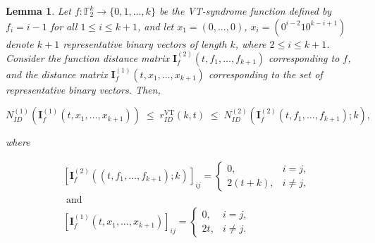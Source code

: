 \documentclass[11 pt]{article}
\numberwithin{equation}{section}
\newtheorem{lemma}[theorem]{Lemma}
\begin{document}
    \begin{lemma}\label{VT_red_bound}
        Let \( f: \mathbb{F}_2^k \rightarrow \{0, 1, \ldots,k\}\) be the VT-syndrome function defined by \( f_i = i - 1 \) for all \( 1 \leq i \leq k + 1 \), and let $x_1 = (0, \ldots, 0)$, \( x_i = (0^{i-2} 1 0^{k - i + 1}) \) denote \( k + 1 \) representative binary vectors of length $k$, where \( 2 \leq i \leq k + 1 \). Consider the function distance matrix \( \bm{I}_f^{(2)}(t, f_1, \ldots, f_{k+1}) \) corresponding to \( f \), and the distance matrix \( \bm{I}_{f}^{(1)}(t, x_1, \ldots, x_{k+1}) \) corresponding to the set of representative binary vectors.  
        Then,
        
        \[
            N_{ID}^{(1)}(\bm{I}_{f}^{(1)}(t, x_1, \ldots, x_{k+1})) 
            \;\leq\;
            r^{\text{VT}}_{ID}(k, t)
            \;\leq\;
            N_{ID}^{(2)}(\bm{I}_f^{(2)}(t, f_1, \ldots, f_{k+1}); k),
        \]
        
        where
        
        \begin{align*}
            &[\bm{I}_f^{(2)}((t, f_1, \ldots, f_{k+1}); k)]_{ij} =
            \begin{cases}
                0,      & i = j, \\[4pt]
                2(t + k), & i \neq j,
            \end{cases}\\
            &\text{ and }\\
            &[\bm{I}_{f}^{(1)}(t, x_1, \ldots, x_{k+1})]_{ij} =
            \begin{cases}
                0,  & i = j, \\[4pt]
                2t, & i \neq j.
            \end{cases}
        \end{align*}
        
    \end{lemma}
        
\end{document}
